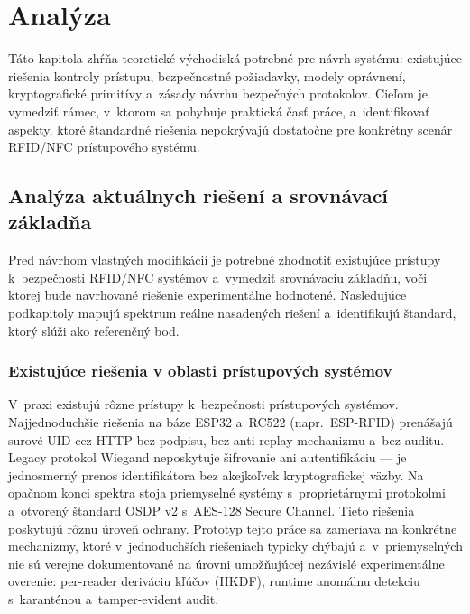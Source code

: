 \section{Analýza}

Táto kapitola zhŕňa teoretické východiská potrebné pre návrh systému: existujúce riešenia kontroly prístupu, bezpečnostné požiadavky, modely oprávnení, kryptografické primitívy a~zásady návrhu bezpečných protokolov. Cieľom je vymedziť rámec, v~ktorom sa pohybuje praktická časť práce, a~identifikovať aspekty, ktoré štandardné riešenia nepokrývajú dostatočne pre konkrétny scenár RFID/NFC prístupového systému.

\subsection{Analýza aktuálnych riešení a srovnávací základňa}

Pred návrhom vlastných modifikácií je potrebné zhodnotiť existujúce prístupy k~bezpečnosti RFID/NFC systémov a~vymedziť srovnávaciu základňu, voči ktorej bude navrhované riešenie experimentálne hodnotené. Nasledujúce podkapitoly mapujú spektrum reálne nasadených riešení a~identifikujú štandard, ktorý slúži ako referenčný bod.

\subsubsection{Existujúce riešenia v oblasti prístupových systémov}

V~praxi existujú rôzne prístupy k~bezpečnosti prístupových systémov. Najjednoduchšie riešenia na báze ESP32 a~RC522 (napr.\ ESP-RFID\cite{ESPRIFD_Github}) prenášajú surové UID cez HTTP bez podpisu, bez anti-replay mechanizmu a~bez auditu. Legacy protokol Wiegand\cite{Wiegand_Zac2013} neposkytuje šifrovanie ani autentifikáciu --- je jednosmerný prenos identifikátora bez akejkoľvek kryptografickej väzby. Na opačnom konci spektra stoja priemyselné systémy s~proprietárnymi protokolmi\cite{HID_iCLASS,ASSA_Aperio} a~otvorený štandard OSDP v2\cite{SIA_OSDP} s~AES-128 Secure Channel. Tieto riešenia poskytujú rôznu úroveň ochrany. Prototyp tejto práce sa zameriava na konkrétne mechanizmy, ktoré v~jednoduchších riešeniach typicky chýbajú a~v~priemyselných nie sú verejne dokumentované na úrovni umožňujúcej nezávislé experimentálne overenie: per-reader deriváciu kľúčov (HKDF), runtime anomálnu detekciu s~karanténou a~tamper-evident audit.

